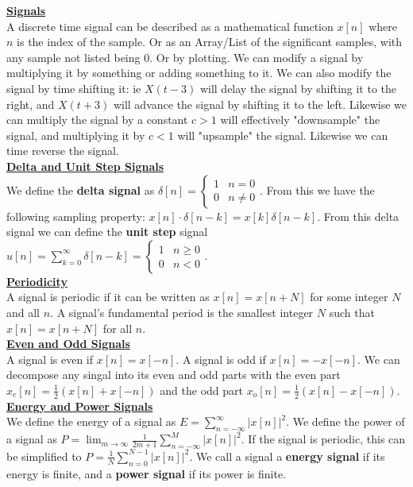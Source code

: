 \documentclass[9pt]{article}
\author{Lawrence Liu}
\begin{document}
\underline{\textbf{Signals}}\\
A discrete time signal can be described as a mathematical function $x[n]$ where $n$ is the index of the sample.
Or as an Array/List of the significant samples, with any sample not listed being 0. 
Or by plotting. We can modify a signal by multiplying it by something or adding something to it. We can also
modify the signal by time shifting it: ie $X(t-3)$ will delay the signal by shifting it to the right, and $X(t+3)$ will
advance the signal by shifting it to the left. Likewise we can multiply the signal by a constant $c>1$ will effectively
"downsample" the signal, and multiplying it by $c<1$ will "upsample" the signal. Likewise we can time reverse the signal. \\
\underline{\textbf{Delta and Unit Step Signals}}\\
We define the \textbf{delta signal} as $\boxed{\delta[n]=\begin{cases}1 & n=0\\0 & n\neq 0\end{cases}}$. From this we have the following sampling
property: $\boxed{x[n]\cdot\delta[n-k]=x[k]\delta[n-k]}$. From this delta signal we can define the \textbf{unit step} signal 
$\boxed{u[n]=\sum_{k=0}^{\infty}\delta[n-k]=\begin{cases}1 & n\geq 0\\0 & n<0\end{cases}}$.\\
\underline{\textbf{Periodicity}}\\
A signal is periodic if it can be written as $x[n]=x[n+N]$ for some integer $N$ and all $n$. A signal's fundamental period 
is the smallest integer $N$ such that $x[n]=x[n+N]$ for all $n$.\\
\underline{\textbf{Even and Odd Signals}}\\
A signal is even if $x[n]=x[-n]$. A signal is odd if $x[n]=-x[-n]$. We can decompose any singal into its even and odd parts
with the even part $x_e[n]=\frac{1}{2}(x[n]+x[-n])$ and the odd part $x_o[n]=\frac{1}{2}(x[n]-x[-n])$.\\
\underline{\textbf{Energy and Power Signals}}\\
We define the energy of a signal as $\boxed{E=\sum_{n=-\infty}^{\infty}|x[n]|^2}$. We define the power of a signal as $
\boxed{P=\lim_{m\to\infty}\frac{1}{2m+1}\sum_{n=-\infty}^{M}|x[n]|^2}$. If the signal is periodic, this can be 
simplified to $\boxed{P=\frac{1}{N}\sum_{n=0}^{N-1}|x[n]|^2}$. We call a signal a \textbf{energy signal} if its energy is finite, and a \textbf{power signal} if its power is finite.
\end{document}
